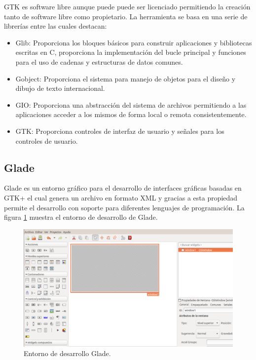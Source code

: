 GTK es software libre aunque puede puede ser licenciado permitiendo la creación tanto de software libre como propietario.
La herramienta se basa en una serie de librerías entre las cuales destacan:

\begin{itemize}
\item Glib: Proporciona los bloques básicos para construir aplicaciones y bibliotecas escritas en C, proporciona la implementación del bucle principal y funciones para el uso de cadenas y estructuras de datos comunes. 
\item Gobject: Proporciona el sistema para manejo de objetos para el diseño y dibujo de texto internacional.
\item GIO: Proporciona una abstracción del sistema de archivos permitiendo a las aplicaciones acceder a los mismos de forma local o remota consistentemente.
\item GTK: Proporciona controles de interfaz de usuario y señales para los controles de usuario.
\end{itemize}

\subsection{Glade}
Glade es un entorno gráfico para el desarrollo de interfaces gráficas basadas en GTK+ el cual genera un archivo en formato XML  y gracias a esta propiedad permite el desarrollo con soporte para diferentes lenguajes de programación.
La figura \ref{fig:glade} muestra el entorno de desarrollo de Glade.

\begin{figure}[h]
	\centering
	\includegraphics[scale=.3]{./Figures/glade.png}
	\caption{Entorno de desarrollo Glade.}
	\label{fig:glade}
\end{figure}

